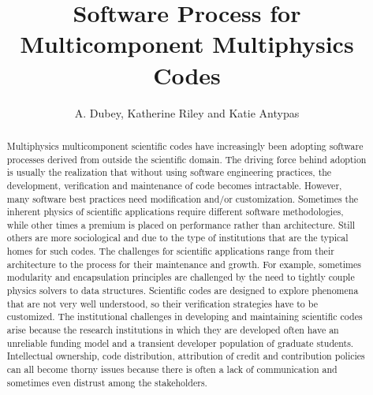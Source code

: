 \documentclass[11pt]{article}
\title{Software Process for Multicomponent Multiphysics
  Codes}
\author{A. Dubey, Katherine Riley and Katie Antypas}
\begin{document}
\maketitle

\begin{abstract}
Multiphysics multicomponent scientific codes have increasingly been 
adopting software processes derived from outside the scientific
domain. The driving force behind adoption is usually the realization
that without using software engineering practices, the development,
verification and maintenance of code becomes intractable. However,
many software best practices need modification and/or customization.
Sometimes the inherent physics of scientific applications require
different software methodologies, while other times a premium is
placed on performance rather than architecture.  Still others are more
sociological and due to the type of institutions that are the typical
homes for such codes. The challenges for scientific applications range
from their architecture to the process for their maintenance and
growth. For example, sometimes modularity and encapsulation principles
are challenged by the need to tightly couple physics solvers to data
structures.  Scientific codes are designed to explore phenomena that
are not very well understood, so their verification strategies have to
be customized. %
The institutional challenges in developing and maintaining scientific codes arise because the 
research institutions in which they are developed often have an unreliable
funding model and a transient developer population of graduate
students. 
Intellectual ownership, code 
distribution, attribution of credit and contribution policies can all
become thorny issues because there is often a lack of communication
and sometimes even distrust among the stakeholders. 

\end{abstract}
\end{document}
